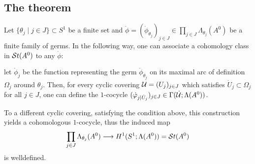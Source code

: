 \subsection{The theorem}
\begin{comment}
  \begin{lem}
    Since the sections of the sheaf $\Lambda(A^0)$ are solutions of the system
    $[A^0,A^0]$ (cf.\ Definition~\ref{defn:StokesSheaf}),
    the theory of differential equations\PROBLEM[source?] tells us that
    \rewrite{sections extend uniquely}.
    Thus we can extend any germ $\phi_\theta\in\Lambda_\theta(A^0)$ uniquely to
    a section $\phi\in\Gamma(\Omega;\Lambda(A^0))$, where $\Omega$ is the
    maximal arc of definition around $\theta$.

    \PROBLEM[The flatness property implicitly satisfied?]
  \end{lem}
\end{comment}
\begin{rem}\label{rem:mapStoToCocy}
  Let $\{\theta_j\mid j\in J\}\subset S^1$ be a finite set and
  $\dot\phi=(\dot\phi_{\theta_j})_{j\in J}
  \in\prod_{j\in J}\Lambda_{\theta_j}(A^0)$ be a finite family of germs.
  In the following way, one can associate a cohomology class in $\mathcal{S}{}t(A^0)$ to
  any $\dot\phi$:
  \begin{einr}
    let $\dot\phi_j$ be the function representing the germ
    $\dot\phi_{\theta_j}$ on its maximal arc of definition $\Omega_j$ around
    $\theta_j$.
    Then, for every cyclic covering $\mathcal{U}=(U_j)_{j\in J}$ which satisfies
    $\dot U_j\subset \Omega_j$ for all $j\in J$, one can define the $1$-cocycle
    $(\dot{\varphi}_{j|\dot U_j})_{j\in J}\in\Gamma(\dot{\mathcal{U}};\Lambda(A^0))$.
  \end{einr}
  To a different cyclic covering, satisfying the condition above, this
  construction yields a cohomologous $1$-cocycle, thus the induced map
  \[
    \prod_{j\in J}\Lambda_{\theta_j}(A^0)
    \longrightarrow
    H^1(S^1;\Lambda(A^0))=\mathcal{S}{}t(A^0)
  \]
  is welldefined.
  \begin{comment}
    \begin{s-rem}
      Let $\dot\phi=(\dot\phi_{\theta})\in\Lambda_\theta(A^0)$ be a cocycle
      consisting only of an single element, which satisfies that the maximal
      arc of definition $\theta$ has opening less than $2\pi$.
      There can not exist a covering consisting of a single element $U$
      satisfying $U\subset\Omega$ and thus no map \dots
    \end{s-rem}
  \end{comment}
\end{rem}
